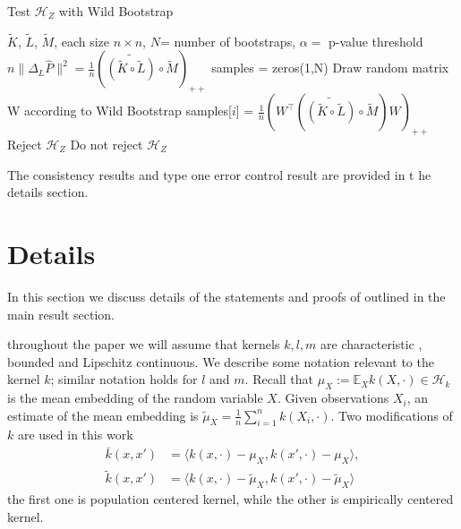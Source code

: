 \documentclass[]{article}
\begin{document}
\begin{algorithm}[tb]
   \caption{Test $\mathcal{H}_Z$ with Wild Bootstrap}
   \label{alg:Lancaster}
\begin{algorithmic}
    $\tilde{K}$, $\tilde{L}$, $\tilde{M}$, each size $n\times n$, $N$= number of bootstraps, $\alpha=$ p-value threshold
   \STATE $n\|\Delta_L\hat{P}\|^2 = \frac{1}{n}\left(\widetilde{\left( \tilde{K} \circ \tilde{L}\right) }\circ \tilde{M} \right)_{++}$
   \STATE samples = zeros(1,N)
   \STATE Draw random matrix W according to Wild Bootstrap
   \STATE samples[$i$] = $\frac{1}{n}\left(W^\intercal\left( \widetilde{\left( \tilde{K} \circ \tilde{L}\right) }\circ \tilde{M} \right)W\right) _{++}$
   \ENDFOR
   \STATE Reject $\mathcal{H}_Z$
   \ELSE
   \STATE Do not reject $\mathcal{H}_Z$
   \ENDIF
\end{algorithmic}
\end{algorithm}

The consistency results and type one error control result are provided in t he details section.




\section{Details} 

In this section we discuss details of the statements and proofs of outlined in the  main result section. 


throughout the paper we  will assume that kernels $k,l,m$ are characteristic  \cite{sriperumbudur2011universality}, bounded and Lipschitz continuous. We describe some notation relevant to the kernel $k$; similar notation holds for $l$ and $m$. Recall that $\mu_X := \mathbb{E}_X k(X,\cdot) \in \mathcal{H}_k$ is the  mean embedding \cite{smola2007hilbert} of the random variable $X$. Given observations $X_i$, an estimate of the mean embedding is $\tilde{\mu}_X = \frac{1}{n}\sum_{i=1}^n k(X_i,\cdot)$. Two modifications  of $k$ are used in this work
\begin{align}
\bar{k}(x,x') &= \langle  k(x,\cdot)-\mu_X,k(x',\cdot)-\mu_X\rangle, \\
\tilde{k}(x,x') &= \langle k(x,\cdot)-\tilde{\mu}_X, k(x',\cdot)-\tilde{\mu}_X \rangle 
\end{align}
the first one is population centered kernel, while the other is empirically centered kernel.  
\end{document}
